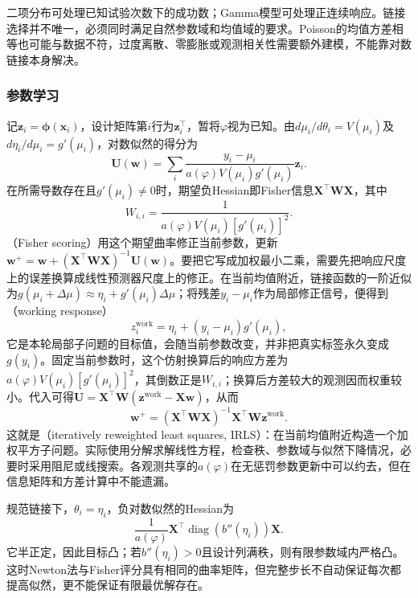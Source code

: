 二项分布可处理已知试验次数下的成功数；Gamma模型可处理正连续响应。链接选择并不唯一，必须同时满足自然参数域和均值域的要求。Poisson的均值方差相等也可能与数据不符，过度离散、零膨胀或观测相关性需要额外建模，不能靠对数链接本身解决。

\subsubsection{参数学习}

记$\bm{z}_i=\bm{\phi}(\bm{x}_i)$，设计矩阵第$i$行为$\bm{z}_i^{\top}$，暂将$\varphi$视为已知。由$d\mu_i/d\theta_i=V(\mu_i)$及$d\eta_i/d\mu_i=g'(\mu_i)$，对数似然的得分为
\begin{equation}
  \bm{U}(\bm{w})
  =\sum_i\frac{y_i-\mu_i}
    {a(\varphi)V(\mu_i)g'(\mu_i)}\bm{z}_i.
  \label{eq:regression-glm-score}
\end{equation}
在所需导数存在且$g'(\mu_i)\ne0$时，期望负Hessian即Fisher信息$\bm{X}^{\top}\bm{W}\bm{X}$，其中
\[
  W_{i,i}=\frac{1}{a(\varphi)V(\mu_i)[g'(\mu_i)]^2}.
\]
（Fisher scoring）用这个期望曲率修正当前参数，更新$\bm{w}^{+}=\bm{w}+(\bm{X}^{\top}\bm{W}\bm{X})^{-1}\bm{U}(\bm{w})$。要把它写成加权最小二乘，需要先把响应尺度上的误差换算成线性预测器尺度上的修正。在当前均值附近，链接函数的一阶近似为$g(\mu_i+\Delta\mu)\approx\eta_i+g'(\mu_i)\Delta\mu$；将残差$y_i-\mu_i$作为局部修正信号，便得到（working response）
\[
  z_i^{\mathrm{work}}
    =\eta_i+(y_i-\mu_i)g'(\mu_i),
\]
它是本轮局部子问题的目标值，会随当前参数改变，并非把真实标签永久变成$g(y_i)$。固定当前参数时，这个仿射换算后的响应方差为$a(\varphi)V(\mu_i)[g'(\mu_i)]^2$，其倒数正是$W_{i,i}$；换算后方差较大的观测因而权重较小。代入可得$\bm{U}=\bm{X}^{\top}\bm{W}(\bm{z}^{\mathrm{work}}-\bm{X}\bm{w})$，从而
\begin{equation}
  \bm{w}^{+}
  =(\bm{X}^{\top}\bm{W}\bm{X})^{-1}
     \bm{X}^{\top}\bm{W}\bm{z}^{\mathrm{work}}.
  \label{eq:regression-irls}
\end{equation}
这就是（iteratively reweighted least squares, IRLS）：在当前均值附近构造一个加权平方子问题。实际使用分解求解线性方程，检查秩、参数域与似然下降情况，必要时采用阻尼或线搜索。各观测共享的$a(\varphi)$在无惩罚参数更新中可以约去，但在信息矩阵和方差计算中不能遗漏。

规范链接下，$\theta_i=\eta_i$，负对数似然的Hessian为
\[
  \frac{1}{a(\varphi)}
  \bm{X}^{\top}\operatorname{diag}(b''(\eta_i))\bm{X}.
\]
它半正定，因此目标凸；若$b''(\eta_i)>0$且设计列满秩，则有限参数域内严格凸。这时Newton法与Fisher评分具有相同的曲率矩阵，但完整步长不自动保证每次都提高似然，更不能保证有限最优解存在。

